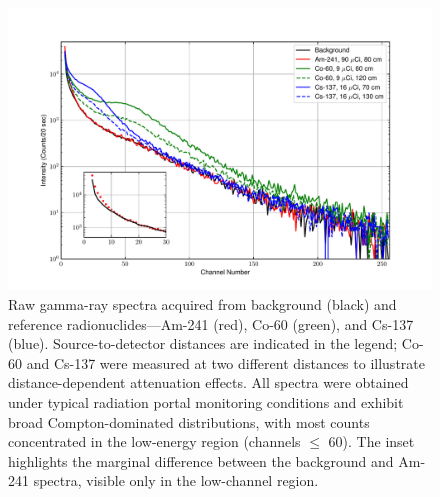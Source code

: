 \documentclass[10pt]{wlscirep}
\begin{document}
\begin{figure}[ht]
\centering
\includegraphics[width=\linewidth]{newfigures/figure1.pdf}
\caption{Raw gamma-ray spectra acquired from background (black) and reference radionuclides—Am-241 (red), Co-60 (green), and Cs-137 (blue). Source-to-detector distances are indicated in the legend; Co-60 and Cs-137 were measured at two different distances to illustrate distance-dependent attenuation effects. All spectra were obtained under typical radiation portal monitoring conditions and exhibit broad Compton-dominated distributions, with most counts concentrated in the low-energy region (channels $\le$ 60). The inset highlights the marginal difference between the background and Am-241 spectra, visible only in the low-channel region.}
\label{fig:bkgref}
\end{figure}
\end{document}
